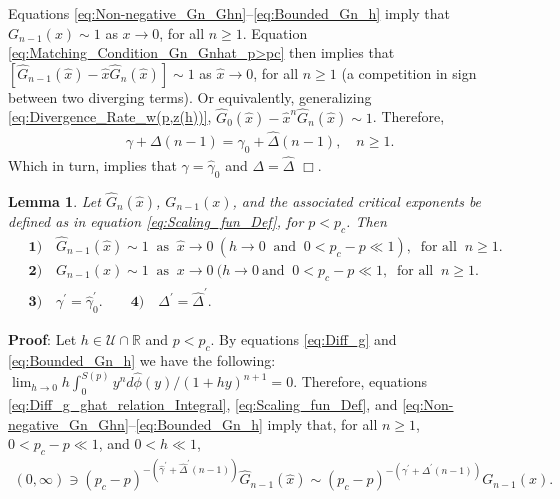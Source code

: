 \documentclass[english,12pt,jmp,graphicx]{revtex4-1}
\newtheorem{lemma}{Lemma}[section]
\newcommand{\ph}{\hat{\phi}}
\newcommand{\gh}{\hat{\gamma}}
\newcommand{\Dh}{\hat{\Delta}}
\newcommand{\xh}{\hat{x}}
\begin{document}
%
Equations \eqref{eq:Non-negative_Gn_Ghn}--\eqref{eq:Bounded_Gn_h}
imply that $G_{n-1}(x)\sim1$ as $x\to0$, for all $n\geq1$. Equation
\eqref{eq:Matching_Condition_Gn_Gnhat_p>pc} then implies that 
$[\hat{G}_{n-1}(\xh)-\xh\hat{G}_n(\xh)]\sim1$ as $\xh\to0$,
for all $n\geq1$ (a competition in sign between two diverging
terms). Or equivalently, generalizing
\eqref{eq:Divergence_Rate_w(p,z(h))},
$\hat{G}_0(\xh)-\xh^n\hat{G}_n(\xh)\sim1$. Therefore,   
%
\begin{align}
  \gamma+\Delta(n-1)=\gh_0+\Dh(n-1), \quad n\geq1.
\end{align}
%
Which in turn, implies that $\gamma=\gh_0$ and $\Delta=\Dh$ $\Box$.
%
%
 \begin{lemma}\label{lem:asymp_Scaling_funs_x_to_0_p<pc}
   Let $\hat{G}_n(\xh)$, $G_{n-1}(x)$, and the associated critical
   exponents be defined as in equation \eqref{eq:Scaling_fun_Def}, for
   $p<p_c$. Then
     \begin{align*}
    &\mathbf{1)}\quad \hat{G}_{n-1}(\xh)\sim1 \ \text{ as } \ \xh\to0 \ (h\to0
    \ \text{ and } \ 0<p_c-p\ll1), \ \text{ for all } \ n\geq1. \\
    &\mathbf{2)}\quad G_{n-1}(x)\sim1 \ \text{ as } \ x\to0 \ (h\to0 \ \text{
      and } \ 0<p_c-p\ll1, \ \text{ for all } \ n\geq1.\\
    &\mathbf{3)}\quad \gamma^\prime=\gh_0^\prime.  \qquad
    \mathbf{4)}\quad \Delta^\prime=\Dh^\prime.   
     \end{align*}
 \end{lemma}
%
\noindent \textbf{Proof}:
%
Let $h\in\mathcal{U}\cap\mathbb{R}$ and $p<p_c$.
By equations \eqref{eq:Diff_g} and \eqref{eq:Bounded_Gn_h} we
have the following: $\lim_{h\to0}h \int_0^{S(p)}y^nd\ph(y)/(1+hy)^{n+1}=0$. 
Therefore, equations \eqref{eq:Diff_g_ghat_relation_Integral}, 
\eqref{eq:Scaling_fun_Def}, and
\eqref{eq:Non-negative_Gn_Ghn}--\eqref{eq:Bounded_Gn_h} imply that,
for all $n\geq1$, $0<p_c-p\ll1$, and $0<h\ll1$,  
%
\begin{align}\label{eq:Matching_Condition_Gn_Gnhat_p<pc}
  (0,\infty)\ni(p_c-p)^{-(\gh^\prime+\Dh^\prime(n-1))}\hat{G}_{n-1}(\xh)
       \sim(p_c-p)^{-(\gamma^\prime+\Delta^\prime(n-1))}G_{n-1}(x).
\end{align}
\end{document}
